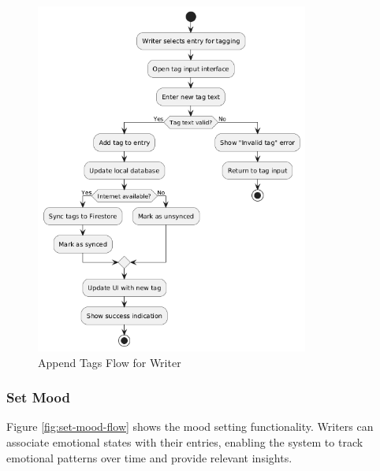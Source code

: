 \begin{figure}[H]
\centering
\includegraphics[width=0.8\textwidth]{files/imgs/append_tags_flow.png}
\caption{Append Tags Flow for Writer}
\label{fig:append-tags-flow}
\end{figure}

\subsubsection{Set Mood}\label{subsubsec:setMood}

Figure \ref{fig:set-mood-flow} shows the mood setting functionality. Writers can associate emotional states with their entries, enabling the system to track emotional patterns over time and provide relevant insights.

